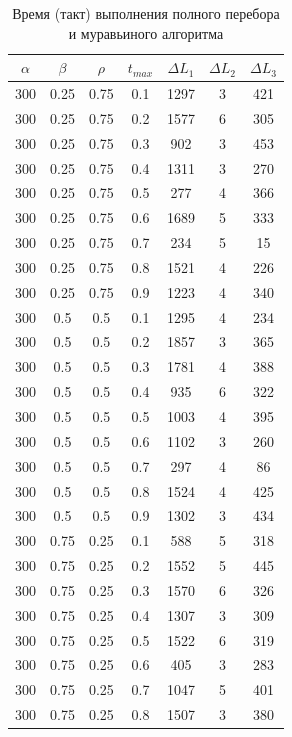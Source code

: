 \documentclass[a4paper,oneside,14pt]{extreport}
\begin{document}
\begin{table}[h]
\caption{Время (такт) выполнения полного перебора и муравьиного алгоритма}
\label{tbl:only}
\begin{center}
	\begin{tabular}{|c|c|c|c|c|c|c|}
		\hline
		$\alpha$ & $\beta$ &$\rho$ &  $t_{max}$ & $\Delta L_{1}$ & $\Delta L_{2}$ & $\Delta L_{3}$\\
		\hline
		300 & 0.25 & 0.75 & 0.1 & 1297 & 3 & 421 \\
		300 & 0.25 & 0.75 & 0.2 & 1577 & 6 & 305 \\
		300 & 0.25 & 0.75 & 0.3 & 902 & 3 & 453 \\
		300 & 0.25 & 0.75 & 0.4 & 1311 & 3 & 270 \\
		300 & 0.25 & 0.75 & 0.5 & 277 & 4 & 366 \\
		300 & 0.25 & 0.75 & 0.6 & 1689 & 5 & 333 \\
		300 & 0.25 & 0.75 & 0.7 & 234 & 5 & 15 \\
		300 & 0.25 & 0.75 & 0.8 & 1521 & 4 & 226 \\
		300 & 0.25 & 0.75 & 0.9 & 1223 & 4 & 340 \\
		300 & 0.5 & 0.5 & 0.1 & 1295 & 4 & 234 \\
		300 & 0.5 & 0.5 & 0.2 & 1857 & 3 & 365 \\
		300 & 0.5 & 0.5 & 0.3 & 1781 & 4 & 388 \\
		300 & 0.5 & 0.5 & 0.4 & 935 & 6 & 322 \\
		300 & 0.5 & 0.5 & 0.5 & 1003 & 4 & 395 \\
		300 & 0.5 & 0.5 & 0.6 & 1102 & 3 & 260 \\
		300 & 0.5 & 0.5 & 0.7 & 297 & 4 & 86 \\
		300 & 0.5 & 0.5 & 0.8 & 1524 & 4 & 425 \\
		300 & 0.5 & 0.5 & 0.9 & 1302 & 3 & 434 \\
		300 & 0.75 & 0.25 & 0.1 & 588 & 5 & 318 \\
		300 & 0.75 & 0.25 & 0.2 & 1552 & 5 & 445 \\
		300 & 0.75 & 0.25 & 0.3 & 1570 & 6 & 326 \\
		300 & 0.75 & 0.25 & 0.4 & 1307 & 3 & 309 \\
		300 & 0.75 & 0.25 & 0.5 & 1522 & 6 & 319 \\
		300 & 0.75 & 0.25 & 0.6 & 405 & 3 & 283 \\
		300 & 0.75 & 0.25 & 0.7 & 1047 & 5 & 401 \\
		300 & 0.75 & 0.25 & 0.8 & 1507 & 3 & 380 \\

\end{tabular}
\end{center}
\end{table}
\end{document}
